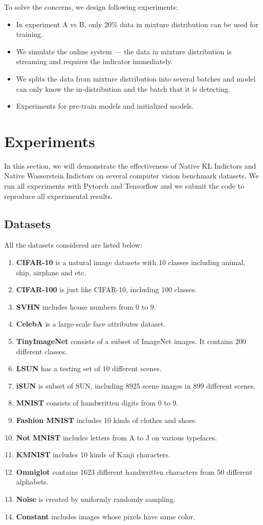 \documentclass[letterpaper]{article} %
\begin{document}
To solve the concerns, we design following experiments:
\begin{itemize}
	\item In experiment A vs B, only 20\% data in mixture distribution can be used for training. 
	\item We simulate the online system --- the data in mixture distribution is streaming and requires the indicator immediately. 
	\item We splits the data from mixture distribution into several batches and model can only know the in-distribution and the batch that it is detecting. 
	\item Experiments for pre-train models and initialized models. 
\end{itemize}

\section{Experiments}
In this section, we will demonstrate the effectiveness of Native KL Indictors and Native Wasserstein Indictors on several computer vision benchmark datasets. We run all experiments with Pytorch and Tensorflow and we submit the code to reproduce all experimental results. 

\subsection{Datasets}
All the datasets considered are listed below:
\begin{enumerate}
	\item \textbf{CIFAR-10} is a natural image datasets with 10 classes including animal, ship, airplane and etc. 
	\item \textbf{CIFAR-100} is just like CIFAR-10, including 100 classes. 
	\item \textbf{SVHN} includes house numbers from 0 to 9. 
	\item \textbf{CelebA} is a large-scale face attributes dataset. 
	\item \textbf{TinyImageNet} consists of a subset of ImageNet images. It contains 200 different classes.
	\item \textbf{LSUN} has a testing set of 10 different scenes. 
	\item \textbf{iSUN} is subset of SUN, including 8925 scene images in 899 different scenes.
	\item \textbf{MNIST} consists of handwritten digits from 0 to 9. 
	\item \textbf{Fashion MNIST} includes 10 kinds of clothes and shoes. 
	\item \textbf{Not MNIST} includes letters from A to J on various typefaces. 
	\item \textbf{KMNIST} includes 10 kinds of Kanji characters.
	\item \textbf{Omniglot} contains 1623 different handwritten characters from 50 different alphabets. 
	\item \textbf{Noise} is created by uniformly randomly sampling. 
	\item \textbf{Constant} includes images whose pixels have same color. 
\end{enumerate}
\end{document}
